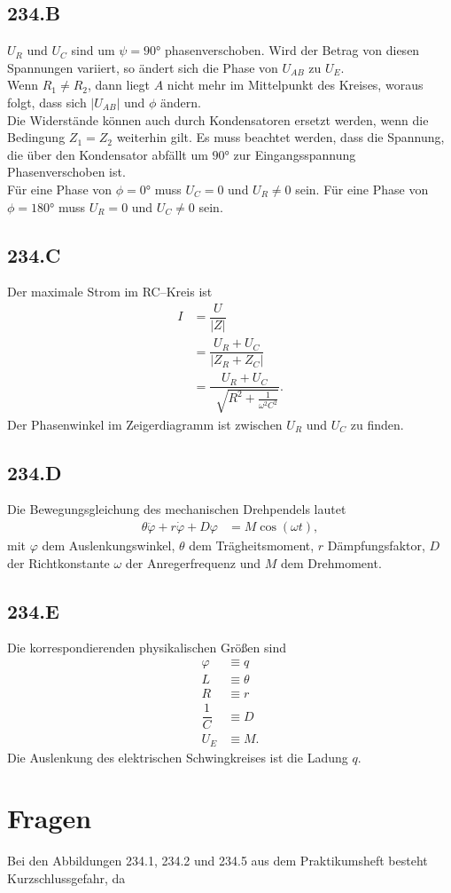 \documentclass[a4paper,12pt]{article}
\numberwithin{equation}{section}
\begin{document}
\subsection{234.B}
$U_R$ und $U_C$ sind um $\psi =\ang{90}$ phasenverschoben. Wird der Betrag von diesen Spannungen variiert, so ändert sich die Phase von $U_{AB}$ zu $U_E$.\\\indent
Wenn $R_1\neq R_2$, dann liegt $A$ nicht mehr im Mittelpunkt des Kreises, woraus folgt, dass sich $|U_{AB}|$ und $\phi $ ändern.\\\indent
Die Widerstände können auch durch Kondensatoren ersetzt werden, wenn die Bedingung $Z_1=Z_2$ weiterhin gilt. Es muss beachtet werden, dass die Spannung, die über den Kondensator abfällt um $\ang{90}$ zur Eingangsspannung Phasenverschoben ist.\\\indent
Für eine Phase von $\phi =\ang{0}$ muss $U_C=0$ und $U_R\neq 0$ sein. Für eine Phase von $\phi =\ang{180}$ muss $U_R=0$ und $U_C\neq 0$ sein.\\

\subsection{234.C}
Der maximale Strom im RC--Kreis ist
\begin{align} 
        I&=\dfrac{U}{|Z|}\\
         &=\dfrac{U_R+U_C}{|Z_R+Z_C|}\\
         &=\dfrac{U_R+U_C}{\,\sqrt[]{R^2+\tfrac{1}{\omega^2 C^2} }}
.\end{align} 
Der Phasenwinkel im Zeigerdiagramm ist zwischen $U_R$ und $U_C$ zu finden.

\subsection{234.D}
Die Bewegungsgleichung des mechanischen Drehpendels lautet
\begin{align} 
        \theta \ddot{\varphi }+r\dot{\varphi }+D\varphi &=M\cos \left(\omega t\right)
,\end{align} 
mit $\varphi $ dem Auslenkungswinkel, $\theta $ dem Trägheitsmoment, $r$ Dämpfungsfaktor, $D$ der Richtkonstante $\omega $ der Anregerfrequenz und $M$ dem Drehmoment.

\subsection{234.E}
Die korrespondierenden physikalischen Größen sind
\begin{align} 
        \varphi &\equiv q\\
        L&\equiv \theta \\
        R&\equiv r\\
        \dfrac{1}{C}&\equiv D\\
        U_E&\equiv M
.\end{align} 
Die Auslenkung des elektrischen Schwingkreises ist die Ladung $q$.

\newpage
\section{Fragen}
Bei den Abbildungen 234.1, 234.2 und 234.5 aus dem Praktikumsheft besteht Kurzschlussgefahr, da 

\end{document}
